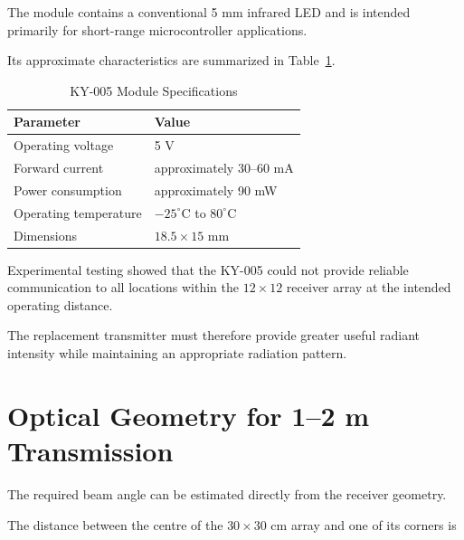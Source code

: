 \documentclass[a4paper,12pt]{article}
\begin{document}
The module contains a conventional 5 mm infrared LED and is intended
primarily for short-range microcontroller applications.

Its approximate characteristics are summarized in
Table~\ref{tab:ky005}.

\begin{table}[H]
    \centering
    \caption{KY-005 Module Specifications}
    \label{tab:ky005}

    \begin{tabular}{@{}ll@{}}
        \toprule
        \textbf{Parameter} &
        \textbf{Value} \\
        \midrule

        Operating voltage &
        5 V \\

        Forward current &
        approximately 30--60 mA \\

        Power consumption &
        approximately 90 mW \\

        Operating temperature &
        \(-25^\circ\text{C}\) to \(80^\circ\text{C}\) \\

        Dimensions &
        \(18.5 \times 15\) mm \\

        \bottomrule
    \end{tabular}

\end{table}

Experimental testing showed that the KY-005 could not provide reliable
communication to all locations within the \(12 \times 12\) receiver
array at the intended operating distance.

The replacement transmitter must therefore provide greater useful
radiant intensity while maintaining an appropriate radiation pattern.



\section{Optical Geometry for 1--2 m Transmission}

The required beam angle can be estimated directly from the receiver
geometry.

The distance between the centre of the \(30 \times 30\) cm array and
one of its corners is
\end{document}
